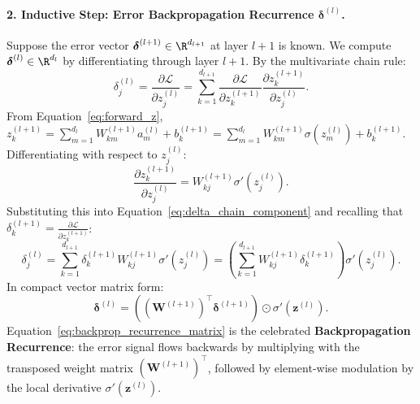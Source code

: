 \paragraph{2. Inductive Step: Error Backpropagation Recurrence $\boldsymbol{\delta}^{(l)}$.}
Suppose the error vector $\boldsymbol{\delta}^{(l+1)} \in \R^{d_{l+1}}$ at layer $l+1$ is known. We compute $\boldsymbol{\delta}^{(l)} \in \R^{d_l}$ by differentiating through layer $l+1$. By the multivariate chain rule:
\begin{equation}
\delta_j^{(l)} = \frac{\partial \mathcal{L}}{\partial z_j^{(l)}} = \sum_{k=1}^{d_{l+1}} \frac{\partial \mathcal{L}}{\partial z_k^{(l+1)}} \frac{\partial z_k^{(l+1)}}{\partial z_j^{(l)}}.
\label{eq:delta_chain_component}
\end{equation}
From Equation~\eqref{eq:forward_z}, $z_k^{(l+1)} = \sum_{m=1}^{d_l} W_{km}^{(l+1)} a_m^{(l)} + b_k^{(l+1)} = \sum_{m=1}^{d_l} W_{km}^{(l+1)} \sigma(z_m^{(l)}) + b_k^{(l+1)}$. Differentiating with respect to $z_j^{(l)}$:
\begin{equation}
\frac{\partial z_k^{(l+1)}}{\partial z_j^{(l)}} = W_{kj}^{(l+1)} \sigma'\left( z_j^{(l)} \right).
\end{equation}
Substituting this into Equation~\eqref{eq:delta_chain_component} and recalling that $\delta_k^{(l+1)} = \frac{\partial \mathcal{L}}{\partial z_k^{(l+1)}}$:
\begin{equation}
\delta_j^{(l)} = \sum_{k=1}^{d_{l+1}} \delta_k^{(l+1)} W_{kj}^{(l+1)} \sigma'\left( z_j^{(l)} \right) = \left( \sum_{k=1}^{d_{l+1}} W_{kj}^{(l+1)} \delta_k^{(l+1)} \right) \sigma'\left( z_j^{(l)} \right).
\end{equation}
In compact vector matrix form:
\begin{equation}
\boldsymbol{\delta}^{(l)} = \left( (\mathbf{W}^{(l+1)})^\top \boldsymbol{\delta}^{(l+1)} \right) \odot \sigma'\left( \mathbf{z}^{(l)} \right).
\label{eq:backprop_recurrence_matrix}
\end{equation}
Equation~\eqref{eq:backprop_recurrence_matrix} is the celebrated \textbf{Backpropagation Recurrence}: the error signal flows backwards by multiplying with the transposed weight matrix $(\mathbf{W}^{(l+1)})^\top$, followed by element-wise modulation by the local derivative $\sigma'(\mathbf{z}^{(l)})$.

